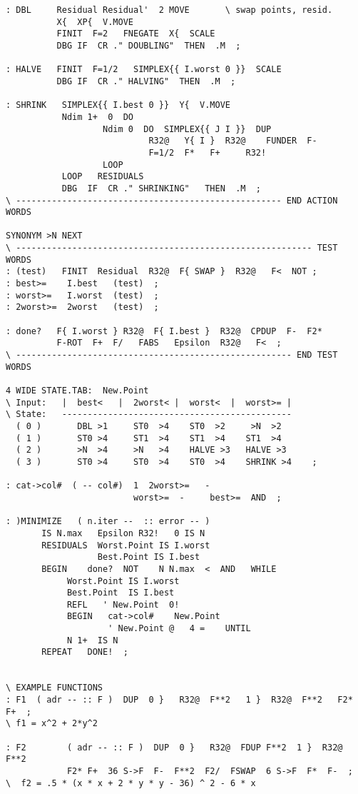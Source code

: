 \begin{lstlisting}
: DBL     Residual Residual'  2 MOVE       \ swap points, resid.
          X{  XP{  V.MOVE
          FINIT  F=2   FNEGATE  X{  SCALE
          DBG IF  CR ." DOUBLING"  THEN  .M  ;

: HALVE   FINIT  F=1/2   SIMPLEX{{ I.worst 0 }}  SCALE
          DBG IF  CR ." HALVING"  THEN  .M  ;

: SHRINK   SIMPLEX{{ I.best 0 }}  Y{  V.MOVE
           Ndim 1+  0  DO
                   Ndim 0  DO  SIMPLEX{{ J I }}  DUP
                            R32@   Y{ I }  R32@    FUNDER  F-
                            F=1/2  F*   F+     R32!
                   LOOP
           LOOP   RESIDUALS
           DBG  IF  CR ." SHRINKING"   THEN  .M  ;
\ ---------------------------------------------------- END ACTION WORDS

SYNONYM >N NEXT
\ ---------------------------------------------------------- TEST WORDS
: (test)   FINIT  Residual  R32@  F{ SWAP }  R32@   F<  NOT ;
: best>=    I.best   (test)  ;
: worst>=   I.worst  (test)  ;
: 2worst>=  2worst   (test)  ;

: done?   F{ I.worst } R32@  F{ I.best }  R32@  CPDUP  F-  F2*
          F-ROT  F+  F/   FABS   Epsilon  R32@   F<  ;
\ ------------------------------------------------------ END TEST WORDS

4 WIDE STATE.TAB:  New.Point
\ Input:   |  best<   |  2worst< |  worst<  |  worst>= |
\ State:   ---------------------------------------------
  ( 0 )       DBL >1     ST0  >4    ST0  >2     >N  >2
  ( 1 )       ST0 >4     ST1  >4    ST1  >4    ST1  >4
  ( 2 )       >N  >4     >N   >4    HALVE >3   HALVE >3
  ( 3 )       ST0 >4     ST0  >4    ST0  >4    SHRINK >4    ;

: cat->col#  ( -- col#)  1  2worst>=   -
                         worst>=  -     best>=  AND  ;

: )MINIMIZE   ( n.iter --  :: error -- )
       IS N.max   Epsilon R32!   0 IS N
       RESIDUALS  Worst.Point IS I.worst
                  Best.Point IS I.best
       BEGIN    done?  NOT    N N.max  <  AND   WHILE
            Worst.Point IS I.worst
            Best.Point  IS I.best
            REFL   ' New.Point  0!
            BEGIN   cat->col#    New.Point
                    ' New.Point @   4 =    UNTIL
            N 1+  IS N
       REPEAT   DONE!  ;


\ EXAMPLE FUNCTIONS
: F1  ( adr -- :: F )  DUP  0 }   R32@  F**2   1 }  R32@  F**2   F2*  F+  ;
\ f1 = x^2 + 2*y^2

: F2        ( adr -- :: F )  DUP  0 }   R32@  FDUP F**2  1 }  R32@  F**2
            F2* F+  36 S->F  F-  F**2  F2/  FSWAP  6 S->F  F*  F-  ;
\  f2 = .5 * (x * x + 2 * y * y - 36) ^ 2 - 6 * x


\end{lstlisting}
